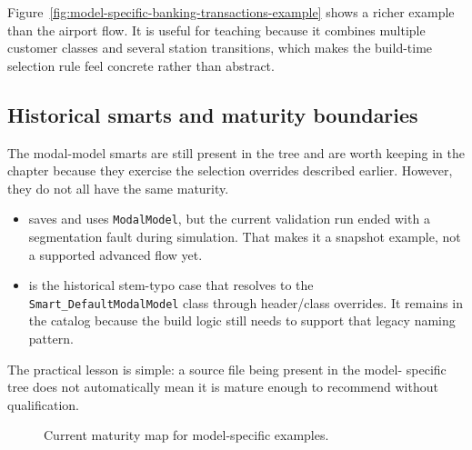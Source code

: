 Figure~\ref{fig:model-specific-banking-transactions-example} shows a richer
example than the airport flow. It is useful for teaching because it combines
multiple customer classes and several station transitions, which makes the
build-time selection rule feel concrete rather than abstract.

\subsection{Historical smarts and maturity boundaries}
\label{subsec:model-specific-maturity}

The modal-model smarts are still present in the tree and are worth keeping in
the chapter because they exercise the selection overrides described earlier.
However, they do not all have the same maturity.

\begin{itemize}
\item {} saves
 and uses \texttt{ModalModel}, but
the current validation run ended with a segmentation fault during simulation.
That makes it a snapshot example, not a supported advanced flow yet.
\item {} is the historical
stem-typo case that resolves to the \texttt{Smart\_DefaultModalModel} class
through header/class overrides. It remains in the catalog because the build
logic still needs to support that legacy naming pattern.
\end{itemize}

The practical lesson is simple: a source file being present in the model-
specific tree does not automatically mean it is mature enough to recommend
without qualification.

\begin{figure}[htbp]
\centering
\caption{Current maturity map for model-specific examples.}
\label{fig:model-specific-maturity-map}
\end{figure}

